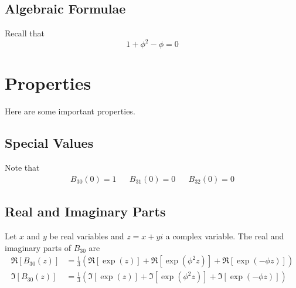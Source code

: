 \subsection{Algebraic Formulae}
Recall that
\begin{equation}
    1 + \phi^{2} - \phi = 0
\end{equation}
\section{Properties}
Here are some important properties.
\subsection{Special Values}
Note that
\begin{align}
    B_{30}(0) = 1 && B_{31}(0) = 0 && B_{32}(0) = 0
\end{align}
\subsection{Real and Imaginary Parts}
Let $x$ and $y$ be real variables and $z = x + yi$ a complex variable. The real and imaginary parts of $B_{30}$ are
\begin{align}
    \Re\left[ B_{30}(z) \right] &= \frac{1}{3} \left( \Re\left[ \exp\left( z \right) \right] + \Re\left[ \exp\left( \phi^{2} z \right) \right] + \Re\left[ \exp\left( -\phi z \right) \right] \right) \\
    \Im\left[ B_{30}(z) \right] &= \frac{1}{3} \left( \Im\left[ \exp\left( z \right) \right] + \Im\left[ \exp\left( \phi^{2} z \right) \right] + \Im\left[ \exp\left( -\phi z \right) \right] \right)
\end{align}
